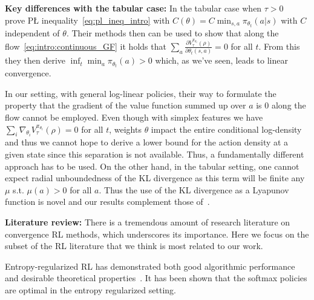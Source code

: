 \documentclass{amsart}
\theoremstyle{definition}
\begin{document}
\textbf{Key differences with the tabular case:}
In the tabular case when $\tau > 0$~\cite{mei2020global} prove P{\L} inequality~\eqref{eq:pl_ineq_intro} with $C(\theta) = C \min_{s,a} \pi_{\theta_t}(a|s)$ with $C$ independent of $\theta$.  
Their methods then can be used to show that along the flow~\eqref{eq:intro:continuous_GF} it holds that 
$\sum_a \tfrac{\partial V^{\pi_{\theta_t}}_\tau(\rho)}{\partial \theta_t(s, a)} =0$ for all $t$. 
From this they then derive $\inf_t \min_a \pi_{\theta_t}(a) > 0$ which, as we've seen, leads to linear convergence.

In our setting, with general log-linear policies, their way to formulate the property that the gradient of the value function summed up over $a$ is $0$ along the flow cannot be employed. 
Even though with simplex features we have $\sum_{i} \nabla_{\theta_i} V^{\pi_{\theta_t}}_\tau(\rho) = 0$ for all $t$, weights $\theta$ impact the entire conditional log-density and thus we cannot hope to derive a lower bound for the  action density at a given state since this separation is not available.
Thus, a fundamentally different approach has to be used.
On the other hand, in the tabular setting, one cannot expect radial unboundedness of the KL divergence as this term will be finite any $\mu$ s.t. $\mu(a) > 0$ for all $a$. 
Thus the use of the KL divergence as a Lyapunov function is novel and our results complement those of~\cite{mei2020global}.


\textbf{Literature review:} 
There is a tremendous amount of research literature on convergence RL methods, which underscores its importance. 
Here we focus on the subset of the RL literature that we think is most related to our work.

Entropy-regularized RL has demonstrated both good algorithmic performance and desirable theoretical properties~\cite{haarnoja2017reinforcement,haarnoja2018soft, geist2019theory,vieillard2020leverage, neu2017unified, fox2015taming,ziebart2010modeling}. 
It has been shown that the softmax policies are optimal in the entropy regularized setting.
\end{document}
